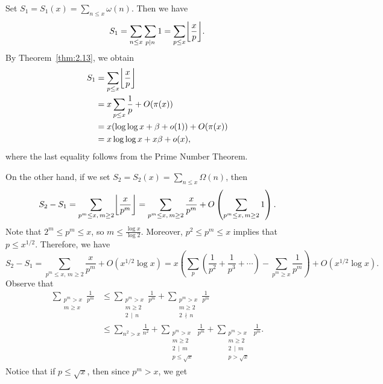 \begin{pf}
    Set $S_1 = S_1(x) = \sum_{n\leq x} \omega(n)$. Then we have 
    \[ S_1 = \sum_{n\leq x} \sum_{p\mid n} 1 = \sum_{p\leq x} \floor*{\frac{x}{p}}. \] 
    By Theorem~\ref{thm:2.13}, we obtain 
    \begin{align*} 
        S_1 &= \sum_{p\leq x} \floor*{\frac{x}{p}} \\
        &= x \sum_{p\leq x} \frac{1}{p} + O(\pi(x)) \\
        &= x(\log\log x + \beta + o(1)) + O(\pi(x)) \\
        &= x\log\log x + x\beta + o(x), 
    \end{align*}
    where the last equality follows from the Prime Number Theorem. 

    On the other hand, if we set $S_2 = S_2(x) = \sum_{n\leq x} \Omega(n)$, then 
    \[ S_2 - S_1 = \sum_{p^m \leq x,\, m \geq 2} \floor*{\frac{x}{p^m}} 
    = \sum_{p^m \leq x,\, m\geq 2} \frac{x}{p^m} + 
    O \left( \sum_{p^m \leq x,\, m \geq 2} 1 \right). \] 
    Note that $2^m \leq p^m \leq x$, so $m \leq \frac{\log x}{\log 2}$. 
    Moreover, $p^2 \leq p^m \leq x$ implies that $p \leq x^{1/2}$. Therefore, 
    we have 
    \[ S_2 - S_1 = \sum_{p^m \leq x,\, m\geq 2} \frac{x}{p^m} + 
    O(x^{1/2} \log x) = x \left( \sum_p \left( \frac{1}{p^2} + 
    \frac{1}{p^3} + \cdots \right) - \sum_{p^m \geq x} \frac{1}{p^m} \right) 
    + O(x^{1/2} \log x). \] 
    Observe that 
    \begin{align*}
        \sum_{\substack{p^m > x \\ m \geq x}} \frac{1}{p^m} 
        &\leq \sum_{\substack{p^m > x \\ m \geq 2 \\ 2\,\mid\,n}} \frac{1}{p^m} 
        + \sum_{\substack{p^m > x \\ m \geq 2 \\ 2\,\nmid\,n}} \frac{1}{p^m} \\
        &\leq \sum_{n^2 > x} \frac{1}{n^2} + \sum_{\substack{p^m > x \\ 
        m \geq 2 \\ 2\,\mid\,m \\ p \leq \sqrt{x}}} \frac{1}{p^m} 
        + \sum_{\substack{p^m > x \\ 
        m \geq 2 \\ 2\,\mid\,m \\ p > \sqrt{x}}} \frac{1}{p^m}. 
    \end{align*}
    Notice that if $p \leq \sqrt{x}$, then since $p^m > x$, we get 

\end{pf}
